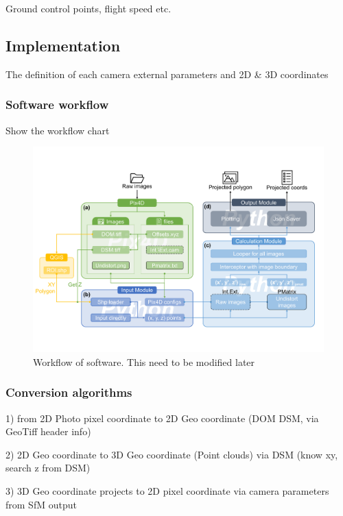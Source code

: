 \documentclass[sensors,article,submit,moreauthors, xelatex]{Definitions/mdpi}
\begin{document}
Ground control points, flight speed etc.

\subsection{Implementation}
The definition of each camera external parameters and 2D \& 3D coordinates

\subsubsection{Software workflow}
Show the workflow chart 

\begin{figure}[H]
\centering
\includegraphics[width=0.95\linewidth]{figures/workflow.pdf}
\caption{Workflow of software. This need to be modified later}
\end{figure}


\subsubsection{Conversion algorithms}
1) from 2D Photo pixel coordinate to 2D Geo coordinate (DOM DSM, via GeoTiff header info)

2) 2D Geo coordinate to 3D Geo coordinate (Point clouds) via DSM (know xy, search z from DSM)

3) 3D Geo coordinate projects to 2D pixel coordinate via camera parameters from SfM output
\end{document}
